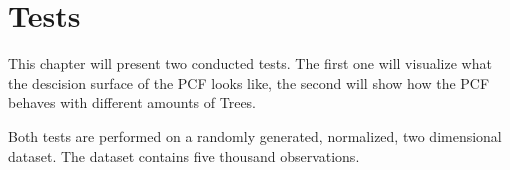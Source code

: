 \section{Tests}
\label{sec:tests}

This chapter will present two conducted tests. The
first one will visualize what the descision surface of the
PCF looks like, the second will show how the PCF behaves
with different amounts of Trees.

Both tests are performed on a randomly generated,
normalized, two dimensional dataset. The dataset contains
five thousand observations.





